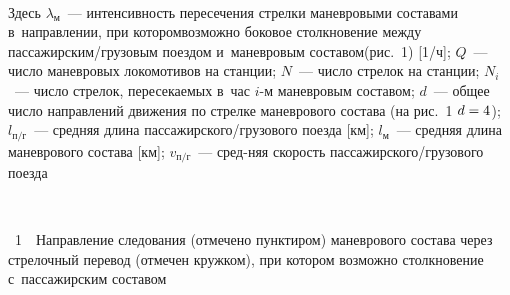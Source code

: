 \begin{multicols}{2}
      \setcounter{figure}{1}
\begin{figure*}[b] %
\vspace*{1pt}
 \begin{center}
 \mbox{%
 \epsfxsize=162.278mm 
 }
 \end{center}
\vspace*{-9pt}
\end{figure*}

\noindent
Здесь $\lambda_{\mathrm{м}}$~--- интенсивность пересечения стрелки маневровыми 
составами в~направлении, при котором\linebreak возможно боковое столкновение между 
пассажирским/грузовым поездом и~маневровым составом\linebreak (рис.~1) [1/ч];  
$Q$~--- число маневровых локомотивов на станции; $N$~--- число стрелок на 
станции; $N_i$~--- число стрелок, пересекаемых в~час $i$-м маневровым 
составом; $d$~--- общее число на\-прав\-ле\-ний движения по стрелке маневрового\linebreak 
состава (на рис.~1 $d\hm=4$); $l_{\mathrm{п/г}}$~--- средняя длина\linebreak  
пасса\-жир\-ско\-го/гру\-зо\-во\-го поезда [км]; $l_{\mathrm{м}}$~--- средняя 
длина маневрового состава [км]; $v_{\mathrm{п/г}}$~--- сред-\linebreak няя скорость 
пас\-са\-жир\-ско\-го/гру\-зо\-во\-го поезда\linebreak\vspace*{-12pt}

{ \begin{center}  %
 \vspace*{1pt}
  \mbox{%
 \epsfxsize=64.436mm 
 }

\end{center}

\noindent
{{\figurename~1}\ \ \small{Направление следования (отмечено пунктиром) маневрового состава через 
стрелочный перевод (отмечен кружком), при котором возможно столкновение с~пассажирским 
составом}}
}

\vspace*{9pt}


\end{multicols}
